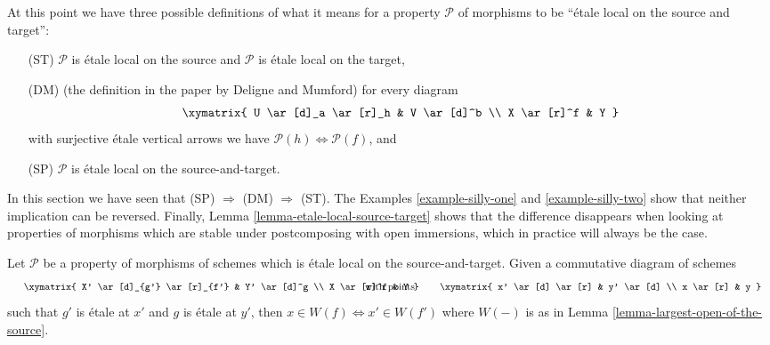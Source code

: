 \begin{remark}
\label{remark-compare-definitions}
At this point we have three possible definitions of what it means for a
property $\mathcal{P}$ of morphisms to be ``\'etale local on the source and
target'':
\begin{enumerate}
\item[(ST)] $\mathcal{P}$ is \'etale local on the source and $\mathcal{P}$ is
\'etale local on the target,
\item[(DM)] (the definition in the paper \cite[Page 100]{DM} by
Deligne and Mumford) for every diagram
$$
\xymatrix{
U \ar[d]_a \ar[r]_h & V \ar[d]^b \\
X \ar[r]^f & Y
}
$$
with surjective \'etale vertical arrows we have
$\mathcal{P}(h) \Leftrightarrow \mathcal{P}(f)$, and
\item[(SP)] $\mathcal{P}$ is \'etale local on the source-and-target.
\end{enumerate}
In this section we have seen that (SP) $\Rightarrow$ (DM) $\Rightarrow$ (ST).
The
Examples \ref{example-silly-one} and \ref{example-silly-two}
show that neither implication can be reversed. Finally,
Lemma \ref{lemma-etale-local-source-target}
shows that the difference disappears when looking at properties of
morphisms which are stable under postcomposing with open immersions, which
in practice will always be the case.
\end{remark}

\begin{lemma}
\label{lemma-etale-etale-local-source-target}
Let $\mathcal{P}$ be a property of morphisms of schemes which
is \'etale local on the source-and-target.
Given a commutative diagram of schemes
$$
\vcenter{
\xymatrix{
X' \ar[d]_{g'} \ar[r]_{f'} & Y' \ar[d]^g \\
X \ar[r]^f & Y
}
}
\quad\text{with points}\quad
\vcenter{
\xymatrix{
x' \ar[d] \ar[r] & y' \ar[d] \\
x \ar[r] & y
}
}
$$
such that $g'$ is \'etale at $x'$ and $g$ is \'etale at $y'$, then
$x \in W(f) \Leftrightarrow x' \in W(f')$
where $W(-)$ is as in Lemma \ref{lemma-largest-open-of-the-source}.
\end{lemma}

